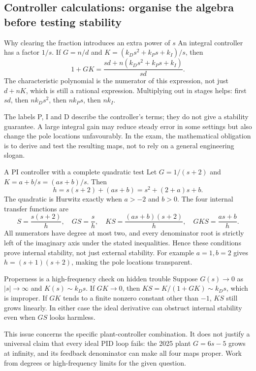 \subsection{Controller calculations: organise the algebra before testing stability}
\begin{concept}{Why clearing the fraction introduces an extra power of $s$}
An integral controller has a factor $1/s$. If $G=n/d$ and $K=(k_Ds^2+k_Ps+k_I)/s$, then
\[1+GK=\frac{sd+n(k_Ds^2+k_Ps+k_I)}{sd}.\]
The characteristic polynomial is the numerator of this expression, not just $d+nK$, which is still a rational expression. Multiplying out in stages helps: first $sd$, then $nk_Ds^2$, then $nk_Ps$, then $nk_I$.

The labels P, I and D describe the controller's terms; they do not give a stability guarantee. A large integral gain may reduce steady error in some settings but also change the pole locations unfavourably. In the exam, the mathematical obligation is to derive and test the resulting maps, not to rely on a general engineering slogan.
\end{concept}
\begin{worked}{A PI controller with a complete quadratic test}
Let $G=1/(s+2)$ and $K=a+b/s=(as+b)/s$. Then
\[h=s(s+2)+(as+b)=s^2+(2+a)s+b.\]
The quadratic is Hurwitz exactly when $a>-2$ and $b>0$. The four internal transfer functions are
\[S=\frac{s(s+2)}h,\quad GS=\frac s h,\quad KS=\frac{(as+b)(s+2)}h,\quad GKS=\frac{as+b}h.\]
All numerators have degree at most two, and every denominator root is strictly left of the imaginary axis under the stated inequalities. Hence these conditions prove internal stability, not just external stability. For example $a=1,b=2$ gives $h=(s+1)(s+2)$, making the pole locations transparent.
\end{worked}
\begin{concept}{Properness is a high-frequency check on hidden trouble}
Suppose $G(s)\to0$ as $|s|\to\infty$ and $K(s)\sim k_Ds$. If $GK\to0$, then $KS=K/(1+GK)\sim k_Ds$, which is improper. If $GK$ tends to a finite nonzero constant other than $-1$, $KS$ still grows linearly. In either case the ideal derivative can obstruct internal stability even when $GS$ looks harmless.

This issue concerns the specific plant-controller combination. It does not justify a universal claim that every ideal PID loop fails: the 2025 plant $G=6s-5$ grows at infinity, and its feedback denominator can make all four maps proper. Work from degrees or high-frequency limits for the given question.
\end{concept}
